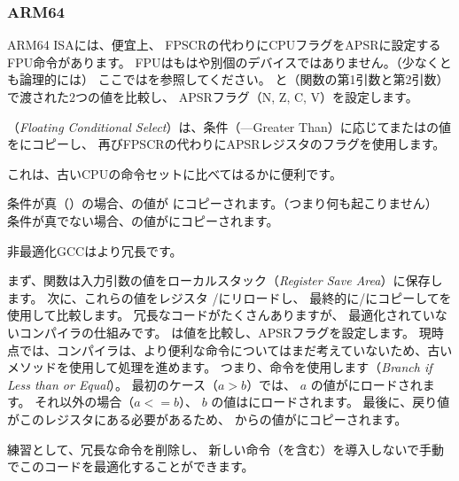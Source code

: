 ﻿\subsubsection{ARM64}




ARM64 \ac{ISA}には、便宜上、
\ac{FPSCR}の代わりにCPUフラグを\ac{APSR}に設定するFPU命令があります。
\ac{FPU}はもはや別個のデバイスではありません。（少なくとも論理的には）
ここではを参照してください。 と（関数の第1引数と第2引数）で渡された2つの値を比較し、
\ac{APSR}フラグ（N, Z, C, V）を設定します。

（\emph{Floating Conditional Select}）は、条件（---Greater Than）に応じてまたはの値をにコピーし、
再び\ac{FPSCR}の代わりに\ac{APSR}レジスタのフラグを使用します。

これは、古いCPUの命令セットに比べてはるかに便利です。

条件が真（）の場合、の値が
にコピーされます。（つまり何も起こりません）
条件が真でない場合、の値がにコピーされます。




非最適化GCCはより冗長です。

まず、関数は入力引数の値をローカルスタック（\emph{Register Save Area}）に保存します。
次に、これらの値をレジスタ
/にリロードし、
最終的に/にコピーしてを使用して比較します。
冗長なコードがたくさんありますが、
最適化されていないコンパイラの仕組みです。 
は値を比較し、\ac{APSR}フラグを設定します。
現時点では、コンパイラは、より便利な命令についてはまだ考えていないため、古いメソッドを使用して処理を進めます。
つまり、命令を使用します（\emph{Branch if Less than or Equal}）。
最初のケース（$a>b$）では、 $a$ の値がにロードされます。
それ以外の場合（$a<=b$）、 $b$ の値はにロードされます。
最後に、戻り値がこのレジスタにある必要があるため、
からの値がにコピーされます。

\mysubparagraph{\Exercise}

練習として、冗長な命令を削除し、
新しい命令（を含む）を導入しないで手動でこのコードを最適化することができます。

